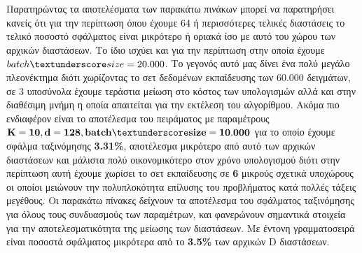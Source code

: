 Παρατηρώντας τα αποτελέσματα των παρακάτω πινάκων μπορεί να παρατηρήσει κανείς ότι για την περίπτωση όπου έχουμε 64 ή περισσότερες τελικές διαστάσεις το τελικό ποσοστό σφάλματος είναι μικρότερο ή οριακά ίσο με αυτό του χώρου των αρχικών διαστάσεων. Το ίδιο ισχύει και για την περίπτωση στην οποία έχουμε $batch\textunderscore size=20.000$. Το γεγονός αυτό μας δίνει ένα πολύ μεγάλο πλεονέκτημα διότι χωρίζοντας το σετ δεδομένων εκπαίδευσης των 60.000 δειγμάτων, σε 3 υποσύνολα έχουμε τεράστια μείωση στο κόστος των υπολογισμών αλλά και στην διαθέσιμη μνήμη η οποία απαιτείται για την εκτέλεση του αλγορίθμου. Ακόμα πιο ενδιαφέρον είναι το αποτέλεσμα του πειράματος με παραμέτρους $\mathbf{K=10, d=128, batch\textunderscore size=10.000}$ για το οποίο έχουμε σφάλμα ταξινόμησης \textbf{3.31\%}, αποτέλεσμα μικρότερο από αυτό των αρχικών διαστάσεων και μάλιστα πολύ οικονομικότερο στον χρόνο υπολογισμού διότι στην περίπτωση αυτή έχουμε χωρίσει το σετ εκπαίδευσης σε \textbf{6} μικρούς σχετικά υποχώρους οι οποίοι μειώνουν την πολυπλοκότητα επίλυσης του προβλήματος κατά πολλές τάξεις μεγέθους. Οι παρακάτω πίνακες δείχνουν τα αποτέλεσμα του σφάλματος ταξινόμησης για όλους τους συνδυασμούς των παραμέτρων, και φανερώνουν σημαντικά στοιχεία για την αποτελεσματικότητα της μείωσης των διαστάσεων. Με έντονη γραμματοσειρά είναι ποσοστά σφάλματος μικρότερα από το \textbf{3.5\%} των αρχικών \textlatin{D} διαστάσεων.

